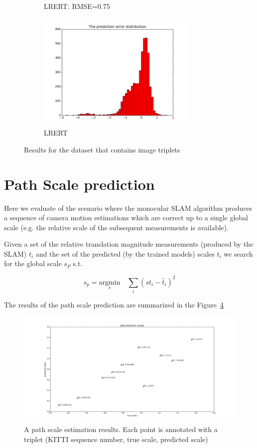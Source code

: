 \documentclass{article}
\begin{document}
\begin{figure}[ht]
\begin{subfigure}[b]{.9\linewidth}
    \caption{LRERT: RMSE=0.75}\label{fig:3c}
  \end{subfigure}%
  \hspace*{-4cm}
  \begin{subfigure}[b]{\linewidth}
    \centering
    \includegraphics[width=3in]{12LRERT_error_histogram_RMSE_075}
    \caption{LRERT}\label{fig:3d}
  \end{subfigure}%
  
  \caption{Results for the dataset that contains image triplets}
  \label{fig:2model_eval}
\end{figure}

\section{Path Scale prediction}

Here we evaluate of the scenario where the monocular SLAM algorithm
produces a sequence of camera motion estimations which are correct up
to a single global scale (e.g. the relative scale of the subsequent
measurements is available).

Given a set of the relative translation magnitude measurements
(produced by the SLAM) $t_i$ and the set of the predicted (by the
trained models) scales $\hat{t}_i$ we search for the global scale $s_P$
s.t.

\[
  s_p = \underset{s}{\text{argmin}}\quad \sum_i{(st_i-\hat{t}_i)^2}
\]

The results of the path scale prediction are summarized in the Figure~\ref{fig:path_predict}
\begin{figure}[ht]
  \hspace*{-4cm}
  \includegraphics[width=7.5in]{path_predict}
  \caption{A path scale estimation results.  Each point is annotated with a triplet (KITTI sequence number, true scale, predicted scale)}\label{fig:path_predict}

\end{figure}
\end{document}
